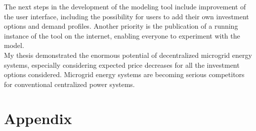 \documentclass[
	11pt,								%
	DIV10,								%
	a4paper,         					%
	oneside,							%
	headheight=20pt,					%
	footheight=20pt,					%
    parskip=full,						%
    listof=totoc,						%
	bibliography=totoc,					%
	index=totoc,						%
]{scrartcl}
\begin{document}
The next steps in the development of the modeling tool include improvement of the user interface, including the possibility for users to add their own investment options and demand profiles. Another priority is the publication of a running instance of the tool on the internet, enabling everyone to experiment with the model.\\
My thesis demonstrated the enormous potential of decentralized microgrid energy systems, especially considering expected price decreases for all the investment options considered. Microgrid energy systems are becoming serious competitors for conventional centralized power systems.
\newpage
{}	

\section{Appendix}
\end{document}
